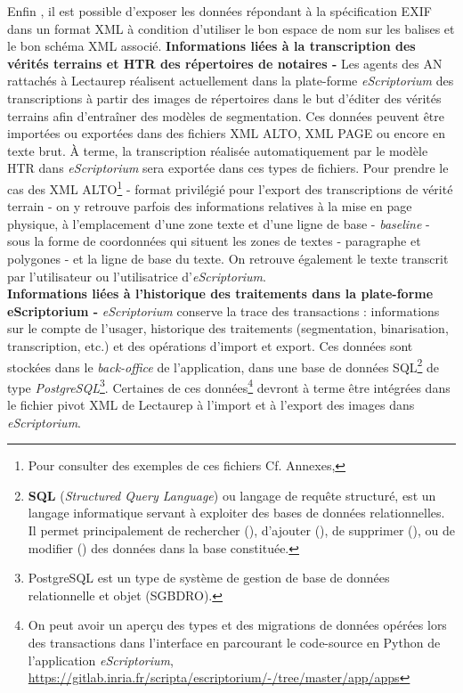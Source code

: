 Enfin , il est possible d'exposer les données répondant à la spécification EXIF dans un format XML à condition d'utiliser le bon espace de nom sur les balises et le bon schéma XML associé.
\newpage
\textbf{Informations liées à la transcription des vérités terrains et HTR des répertoires de notaires -} 
Les agents des AN rattachés à Lectaurep réalisent actuellement dans la plate-forme \textit{eScriptorium} des transcriptions à partir des images de répertoires dans le but d'éditer des vérités terrains afin d'entraîner des modèles de segmentation. Ces données peuvent être importées ou exportées dans des fichiers XML ALTO, XML PAGE ou encore en texte brut. À terme, la transcription réalisée automatiquement par le modèle HTR dans \textit{eScriptorium} sera exportée dans ces types de fichiers. Pour prendre le cas des XML ALTO\footnote{Pour consulter des exemples de ces fichiers Cf. Annexes, } - format privilégié pour l'export des transcriptions de vérité terrain - on y retrouve parfois des informations relatives à la mise en page physique, à l'emplacement d'une zone texte et d'une ligne de base - \textit{baseline} - sous la forme de coordonnées qui situent les zones de textes - paragraphe et polygones - et la ligne de base du texte. On retrouve également le texte transcrit par l'utilisateur ou l'utilisatrice d'\textit{eScriptorium}.\\

\textbf{Informations liées à l'historique des traitements dans la plate-forme eScriptorium -} \textit{eScriptorium} conserve la trace des transactions  : informations sur le compte de l'usager, historique des traitements (segmentation, binarisation, transcription, etc.) et des opérations d'import et export. Ces données sont stockées dans le \textit{back-office} de l'application, dans une base de données SQL\footnote{\textbf{SQL} (\textit{Structured Query Language}) ou langage de requête structuré, est un langage informatique servant à exploiter des bases de données relationnelles. Il permet principalement de rechercher (), d'ajouter (), de supprimer (), ou de modifier () des données dans la base constituée.} de type \textit{PostgreSQL}\footnote{PostgreSQL est un type de système de gestion de base de données relationnelle et objet (SGBDRO).}. Certaines de ces données\footnote{On peut avoir un aperçu des types et des migrations de données opérées lors des transactions dans l'interface en parcourant le code-source en Python de l'application \textit{eScriptorium}, \url{https://gitlab.inria.fr/scripta/escriptorium/-/tree/master/app/apps}} devront à terme  être intégrées dans le fichier pivot XML de Lectaurep à l'import et à l'export des images dans \textit{eScriptorium}.\\

